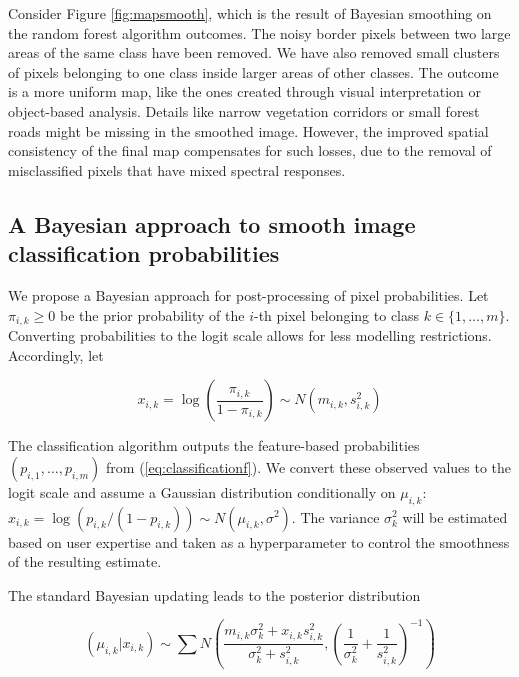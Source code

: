 \documentclass[
  shortnames]{jss}
\begin{document}
Consider Figure \ref{fig:mapsmooth}, which is the result of Bayesian smoothing on the random forest algorithm outcomes. The noisy border pixels between two large areas of the same class have been removed. We have also removed small clusters of pixels belonging to one class inside larger areas of other classes. The outcome is a more uniform map, like the ones created through visual interpretation or object-based analysis. Details like narrow vegetation corridors or small forest roads might be missing in the smoothed image. However, the improved spatial consistency of the final map compensates for such losses, due to the removal of misclassified pixels that have mixed spectral responses.

\subsection{A Bayesian approach to smooth image classification probabilities}\label{a-bayesian-approach-to-smooth-image-classification-probabilities}

We propose a Bayesian approach for post-processing of pixel probabilities. Let \(\pi_{i,k} \geq 0\) be the prior probability of the \(i\)-th pixel belonging to class \(k \in \{1, \ldots, m\}\). Converting probabilities to the logit scale allows for less modelling restrictions. Accordingly, let

\begin{equation} 
x_{i,k} = \log\left( \frac{\pi_{i,k}}{1-\pi_{i,k}} \right) \sim N(m_{i,k}, s^2_{i,k}) 
\end{equation}

The classification algorithm outputs the feature-based probabilities \((p_{i,1}, \ldots, p_{i,m})\) from (\ref{eq:classificationf}). We convert these observed values to the logit
scale and assume a Gaussian distribution conditionally on \(\mu_{i,k}\):
\(x_{i,k} = \log(p_{i,k}/(1-p_{i,k})) \sim N(\mu_{i,k}, \sigma^2)\).
The variance \(\sigma^2_{k}\) will be estimated based on user expertise and taken as a hyperparameter to control the smoothness of the resulting estimate.

The standard Bayesian updating \citep{Gelman2014} leads to the posterior distribution

\begin{equation}
(\mu_{i,k} | x_{i,k}) \sim \sum N\left(  \frac{m_{i,k} \sigma^2_{k} +
    x_{i,k} s^2_{i,k}}{ \sigma^2_{k} +s^2_{i,k}} , \left( \frac{1}{\sigma_k^2} + \frac{1}{s^2_{i,k}} \right)^{-1} \right) 
\label{eq:BayesUpdate}
\end{equation}
\end{document}

